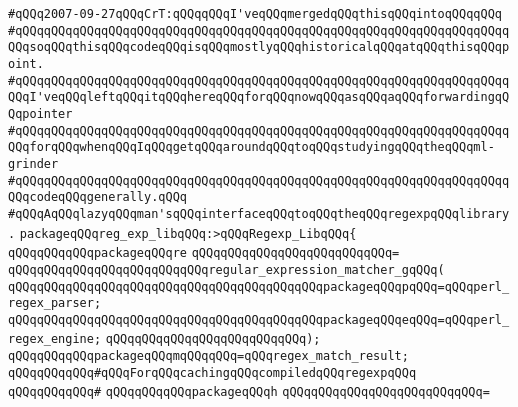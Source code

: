 \label{src/lib/c-glue/ml-grinder/regexp-lib.pkg}
\verb|#qQQq2007-09-27qQQqCrT:qQQqqQQqI'veqQQqmergedqQQqthisqQQqintoqQQqqQQq|\newline
\verb|#qQQqqQQqqQQqqQQqqQQqqQQqqQQqqQQqqQQqqQQqqQQqqQQqqQQqqQQqqQQqqQQqqQQqqQQqsoqQQqthisqQQqcodeqQQqisqQQqmostlyqQQqhistoricalqQQqatqQQqthisqQQqpoint.|\newline
\verb|#qQQqqQQqqQQqqQQqqQQqqQQqqQQqqQQqqQQqqQQqqQQqqQQqqQQqqQQqqQQqqQQqqQQqqQQqI'veqQQqleftqQQqitqQQqhereqQQqforqQQqnowqQQqasqQQqaqQQqforwardingqQQqpointer|\newline
\verb|#qQQqqQQqqQQqqQQqqQQqqQQqqQQqqQQqqQQqqQQqqQQqqQQqqQQqqQQqqQQqqQQqqQQqqQQqforqQQqwhenqQQqIqQQqgetqQQqaroundqQQqtoqQQqstudyingqQQqtheqQQqml-grinder|\newline
\verb|#qQQqqQQqqQQqqQQqqQQqqQQqqQQqqQQqqQQqqQQqqQQqqQQqqQQqqQQqqQQqqQQqqQQqqQQqcodeqQQqgenerally.qQQq|\newline
\newline
\verb|#qQQqAqQQqlazyqQQqman'sqQQqinterfaceqQQqtoqQQqtheqQQqregexpqQQqlibrary.|\newline
\newline
\verb|packageqQQqreg_exp_libqQQq:>qQQqRegexp_LibqQQq{|\newline
\newline
\verb|qQQqqQQqqQQqpackageqQQqre|\newline
\verb|qQQqqQQqqQQqqQQqqQQqqQQqqQQq=|\newline
\verb|qQQqqQQqqQQqqQQqqQQqqQQqqQQqregular_expression_matcher_gqQQq(|\newline
\verb|qQQqqQQqqQQqqQQqqQQqqQQqqQQqqQQqqQQqqQQqqQQqpackageqQQqpqQQq=qQQqperl_regex_parser;|\newline
\verb|qQQqqQQqqQQqqQQqqQQqqQQqqQQqqQQqqQQqqQQqqQQqpackageqQQqeqQQq=qQQqperl_regex_engine;|\newline
\verb|qQQqqQQqqQQqqQQqqQQqqQQqqQQq);|\newline
\newline
\verb|qQQqqQQqqQQqpackageqQQqmqQQqqQQq=qQQqregex_match_result;|\newline
\newline
\verb|qQQqqQQqqQQq#qQQqForqQQqcachingqQQqcompiledqQQqregexpqQQq|\newline
\verb|qQQqqQQqqQQq#|\newline
\verb|qQQqqQQqqQQqpackageqQQqh|\newline
\verb|qQQqqQQqqQQqqQQqqQQqqQQqqQQq=|\newline
